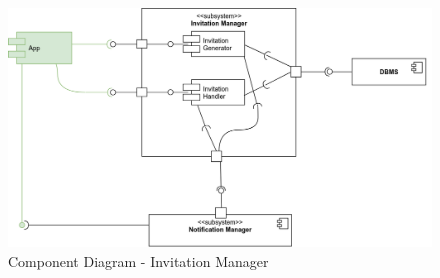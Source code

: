 		\begin{figure}[H]	
			\centerline{\includegraphics[width=0.9\paperwidth]{Images/CD_InvitationManager}}
			\caption{Component Diagram - Invitation Manager}
		\end{figure}
	
	\filbreak
